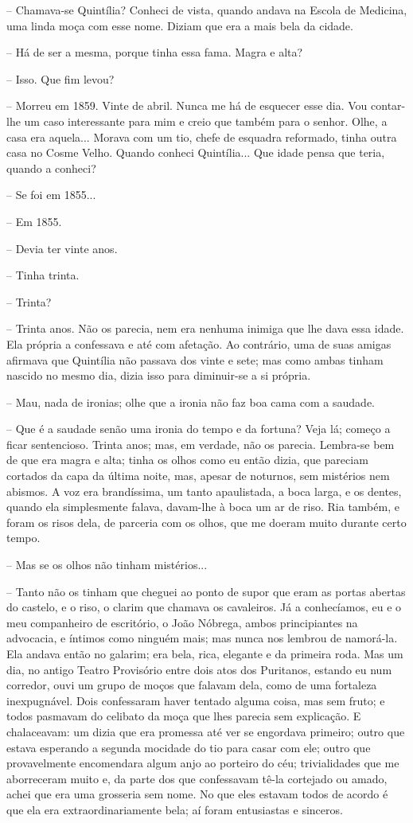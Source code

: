 -- Chamava-se Quintília? Conheci de vista, quando andava na Escola de
Medicina, uma linda moça com esse nome. Diziam que era a mais bela da
cidade.

-- Há de ser a mesma, porque tinha essa fama. Magra e alta?

-- Isso. Que fim levou?

-- Morreu em 1859. Vinte de abril. Nunca me há de esquecer esse dia. Vou
contar-lhe um caso interessante para mim e creio que também para o
senhor. Olhe, a casa era aquela... Morava com um tio, chefe de esquadra
reformado, tinha outra casa no Cosme Velho. Quando conheci Quintília...
Que idade pensa que teria, quando a conheci?

-- Se foi em 1855...

-- Em 1855.

-- Devia ter vinte anos.

-- Tinha trinta.

-- Trinta?

-- Trinta anos. Não os parecia, nem era nenhuma inimiga que lhe dava
essa idade. Ela própria a confessava e até com afetação. Ao contrário,
uma de suas amigas afirmava que Quintília não passava dos vinte e sete;
mas como ambas tinham nascido no mesmo dia, dizia isso para diminuir-se
a si própria.

-- Mau, nada de ironias; olhe que a ironia não faz boa cama com a
saudade.

-- Que é a saudade senão uma ironia do tempo e da fortuna? Veja lá;
começo a ficar sentencioso. Trinta anos; mas, em verdade, não os
parecia. Lembra-se bem de que era magra e alta; tinha os olhos como eu
então dizia, que pareciam cortados da capa da última noite, mas, apesar
de noturnos, sem mistérios nem abismos. A voz era brandíssima, um tanto
apaulistada, a boca larga, e os dentes, quando ela simplesmente falava,
davam-lhe à boca um ar de riso. Ria também, e foram os risos dela, de
parceria com os olhos, que me doeram muito durante certo tempo.

-- Mas se os olhos não tinham mistérios...

-- Tanto não os tinham que cheguei ao ponto de supor que eram as portas
abertas do castelo, e o riso, o clarim que chamava os cavaleiros. Já a
conhecíamos, eu e o meu companheiro de escritório, o João Nóbrega, ambos
principiantes na advocacia, e íntimos como ninguém mais; mas nunca nos
lembrou de namorá-la. Ela andava então no galarim; era bela, rica,
elegante e da primeira roda. Mas um dia, no antigo Teatro Provisório
entre dois atos dos Puritanos, estando eu num corredor, ouvi um grupo de
moços que falavam dela, como de uma fortaleza inexpugnável. Dois
confessaram haver tentado alguma coisa, mas sem fruto; e todos pasmavam
do celibato da moça que lhes parecia sem explicação. E chalaceavam: um
dizia que era promessa até ver se engordava primeiro; outro que estava
esperando a segunda mocidade do tio para casar com ele; outro que
provavelmente encomendara algum anjo ao porteiro do céu; trivialidades
que me aborreceram muito e, da parte dos que confessavam tê-la cortejado
ou amado, achei que era uma grosseria sem nome. No que eles estavam
todos de acordo é que ela era extraordinariamente bela; aí foram
entusiastas e sinceros.

